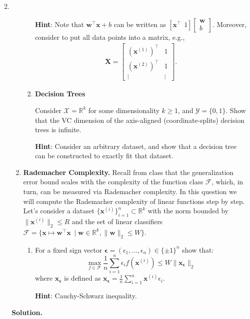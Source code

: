 \documentclass{article}
\newenvironment{Q}
        {%
          \clearpage
          \item
        }
        {%
          \phantom{s} %
          \bigskip
          \textbf{Solution.}
        }
\begin{document}
\begin{enumerate}[font={\Large\bfseries},left=0pt]
\begin{Q}
\begin{enumerate}
\begin{enumerate}
  \textbf{Hint}: Note that $\bm{w}^\top \bm{x}+b$ can be written as $[\bm{x}^\top\ \ 1] \left[\begin{array}{c}
   \bm{w} \\
  b
  \end{array}\right]$. Moreover, consider to put all data points into a matrix, e.g.,
  \begin{align}
     \bm{X}= \left[\begin{array}{cc}
   (\bm{x}^{(1)})^\top & 1 \\
   (\bm{x}^{(2)})^\top & 1 \\
  \vdots & \vdots
  \end{array}\right] .
  \end{align}
  
  \item \textbf{Decision Trees}
  
  Consider $\mathcal{X}=\mathbb{R}^k$ for some dimensionality $k\geq 1$, and $\mathcal{Y}=\{0, 1\}$. Show that the VC dimension of the axis-aligned (coordinate-splits) decision trees is infinite. 
  
  \textbf{Hint}: Consider an arbitrary dataset, and show that a decision tree can be constructed to exactly fit that dataset.
  \end{enumerate}

  \item \textbf{Rademacher Complexity.} 
  Recall from class that the generalization error bound scales with the complexity of the function class $\mathcal{F}$, 
    which, in turn, can be measured via Rademacher complexity. In this question we will compute the Rademacher complexity of linear functions step by step.
    Let's consider a dataset $\{\bm{x}^{(i)}\}_{i=1}^{n}\subset \mathbb{R}^k$ with the norm bounded by $\|\bm{x}^{(i)}\|_2 \leq R$ 
    and the set of linear classifiers $\mathcal{F} = \{\bm{x} \mapsto \bm{w}^\top \bm{x}\ \mid \bm{w}\in \mathbb{R}^k, \|\bm{w}\|_2 \leq W \}$. 
    
    \begin{enumerate}
        \item For a fixed sign vector $\bm{\epsilon} = (\epsilon_1, ..., \epsilon_n) \in \{\pm 1\}^n$ show that:
    $$
      \max_{f\in\mathcal{F}}\frac{1}{n}\sum_{i=1}^{n}\epsilon_i f(\bm{x}^{(i)}) \leq W\|\bm{x_{\bm{\epsilon}}}\|_2
    $$
    where $\bm{x}_{\bm{\epsilon}}$ is defined as $\bm{x}_{\bm{\epsilon}} = \frac{1}{n}\sum_{i=1}^n \bm{x}^{(i)}\epsilon_i$. 
    
    \textbf{Hint}: Cauchy-Schwarz inequality.
    

\end{enumerate}
\end{enumerate}
\end{Q}
\end{enumerate}
\end{document}
